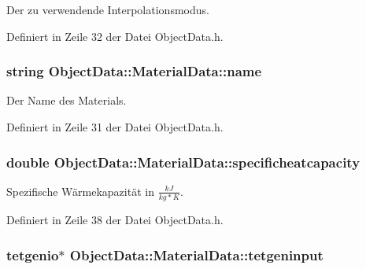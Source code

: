 Der zu verwendende Interpolationsmodus. 



Definiert in Zeile 32 der Datei Object\-Data.\-h.

\hypertarget{structObjectData_1_1MaterialData_a795f1265218b9a125559bbe9231f3c8d}{
\subsubsection[{name}]{\setlength{\rightskip}{0pt plus 5cm}string Object\-Data\-::\-Material\-Data\-::name}}\label{structObjectData_1_1MaterialData_a795f1265218b9a125559bbe9231f3c8d}


Der Name des Materials. 



Definiert in Zeile 31 der Datei Object\-Data.\-h.

\hypertarget{structObjectData_1_1MaterialData_a784e2b70f98d146979fd422d41445fea}{
\subsubsection[{specificheatcapacity}]{\setlength{\rightskip}{0pt plus 5cm}double Object\-Data\-::\-Material\-Data\-::specificheatcapacity}}\label{structObjectData_1_1MaterialData_a784e2b70f98d146979fd422d41445fea}


Spezifische Wärmekapazität in $\frac{kJ}{kg*K}$. 



Definiert in Zeile 38 der Datei Object\-Data.\-h.

\hypertarget{structObjectData_1_1MaterialData_ab752395b4aedbe011fa49de7fbbd36ee}{
\subsubsection[{tetgeninput}]{\setlength{\rightskip}{0pt plus 5cm}tetgenio$\ast$ Object\-Data\-::\-Material\-Data\-::tetgeninput}}\label{structObjectData_1_1MaterialData_ab752395b4aedbe011fa49de7fbbd36ee}


